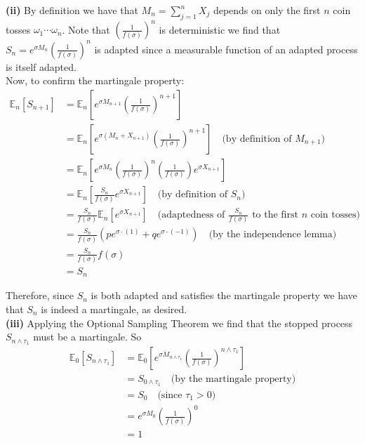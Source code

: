 \documentclass[12pt]{article}
\newlength\tindent
\renewcommand{\indent}{\hspace*{\tindent}}
\newcommand{\E}{\mathbb E}
\begin{document}
{\bf (ii)} By definition we have that $M_n = \sum^n_{j = 1} X_j$ depends on only the first $n$ coin tosses $\omega_1\cdots\omega_n$. Note that $\left( \frac{1}{f(\sigma)} \right)^n$ is deterministic we find that $S_n = e^{\sigma M_n} \left( \frac{1}{f(\sigma)} \right)^n$ is adapted since a measurable function of an adapted process is itself adapted. \\

Now, to confirm the martingale property:
\begin{align*}
	\E_n \left[ S_{n + 1} \right] &= \E_n \left[ e^{\sigma M_{n + 1}} \left( \frac{1}{f(\sigma)} \right)^{n + 1} \right] \\
	&= \E_n \left[ e^{\sigma (M_n + X_{n + 1})} \left( \frac{1}{f(\sigma)} \right)^{n + 1} \right] \quad \text{(by definition of $M_{n + 1}$)} \\
	&= \E_n \left[ e^{\sigma M_n} \left( \frac{1}{f(\sigma)} \right)^n \left( \frac{1}{f(\sigma)} \right) e^{\sigma X_{n + 1}} \right] \\
	&= \E_n \left[ \frac{S_n}{f(\sigma)} e^{\sigma X_{n + 1}} \right] \quad \text{(by definition of $S_n$)} \\
	&= \frac{ S_n }{ f(\sigma) } \E_n \left[ e^{\sigma X_{n + 1}} \right] \quad \text{(adaptedness of $\frac{S_n}{f(\sigma)}$ to the first $n$ coin tosses)} \\
	&= \frac{ S_n }{ f(\sigma) } \left( pe^{\sigma \cdot (1)} + qe^{\sigma \cdot(-1)} \right) \quad \text{(by the independence lemma)} \\
	&= \frac{ S_n }{ f(\sigma) } f(\sigma) \\
	&= S_n
\end{align*}

\indent Therefore, since $S_n$ is both adapted and satisfies the martingale property we have that $S_n$ is indeed a martingale, as desired. \\

{\bf (iii)} Applying the Optional Sampling Theorem we find that the stopped process $S_{n\land\tau_1}$ must be a martingale. So
\begin{align*}
	\E_0 \left[ S_{n\land\tau_1} \right] &= \E_0 \left[ e^{\sigma M_{n\land\tau_1}} \left( \frac{1}{f(\sigma)} \right)^{n\land\tau_1} \right] \\
	&= S_{0\land\tau_1} \quad \text{(by the martingale property)} \\
	&= S_0 \quad \text{(since $\tau_1 > 0$)} \\
	&= e^{\sigma M_0} \left( \frac{1}{f(\sigma)} \right)^0 \\
	&= 1
\end{align*}
\end{document}
